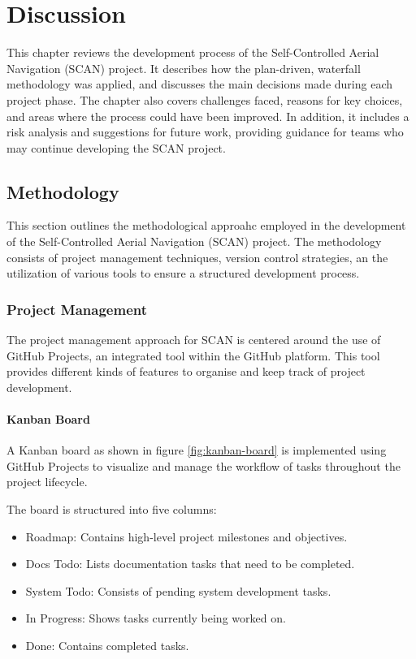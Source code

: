 \chapter{Discussion}

This chapter reviews the development process of the Self-Controlled Aerial Navigation (SCAN) project. It describes how the plan-driven, waterfall methodology was applied, and discusses the main decisions made during each project phase. The chapter also covers challenges faced, reasons for key choices, and areas where the process could have been improved. In addition, it includes a risk analysis and suggestions for future work, providing guidance for teams who may continue developing the SCAN project.

\section{Methodology}

This section outlines the methodological approahc employed in the development of the Self-Controlled Aerial Navigation (SCAN) project. The methodology consists of project management techniques, version control strategies, an the utilization of various tools to ensure a structured development process.

\subsection{Project Management}
The project management approach for SCAN is centered around the use of GitHub Projects, an integrated tool within the GitHub platform. This tool provides different kinds of features to organise and keep track of project development.

\subsubsection{Kanban Board}
A Kanban board as shown in figure \ref{fig:kanban-board} is implemented using GitHub Projects to visualize and manage the workflow of tasks throughout the project lifecycle. 

The board is structured into five columns:

\begin{itemize}
    \item Roadmap: Contains high-level project milestones and objectives.
    \item Docs Todo: Lists documentation tasks that need to be completed.
    \item System Todo: Consists of pending system development tasks.
    \item In Progress: Shows tasks currently being worked on.
    \item Done: Contains completed tasks.
\end{itemize}

